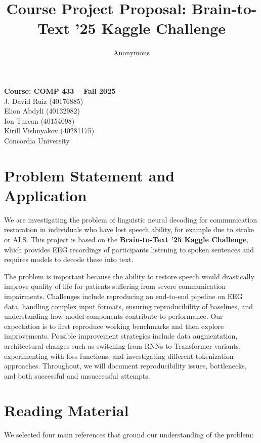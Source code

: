 \documentclass[10pt,twocolumn,letterpaper]{article}
\title{Course Project Proposal: Brain-to-Text '25 Kaggle Challenge}
\author{Anonymous} %
\begin{document}
\maketitle
\thispagestyle{empty}

\begin{center}
\textbf{Course: COMP 433 -- Fall 2025} \\[4pt]
J. David Ruiz (40176885) \\
Elion Abdyli (40132982) \\
Ion Turcan (40154098) \\
Kirill Vishnyakov (40281175) \\[6pt]
Concordia University
\end{center}

\section{Problem Statement and Application}
We are investigating the problem of linguistic neural decoding for communication restoration in individuals who have lost speech ability, for example due to stroke or ALS.  
This project is based on the \textbf{Brain-to-Text '25 Kaggle Challenge}, which provides EEG recordings of participants listening to spoken sentences and requires models to decode these into text.  

The problem is important because the ability to restore speech would drastically improve quality of life for patients suffering from severe communication impairments.  
Challenges include reproducing an end-to-end pipeline on EEG data, handling complex input formats, ensuring reproducibility of baselines, and understanding how model components contribute to performance.  
Our expectation is to first reproduce working benchmarks and then explore improvements.  
Possible improvement strategies include data augmentation, architectural changes such as switching from RNNs to Transformer variants, experimenting with loss functions, and investigating different tokenization approaches.  
Throughout, we will document reproducibility issues, bottlenecks, and both successful and unsuccessful attempts.  

\section{Reading Material}
We selected four main references that ground our understanding of the problem:  
\end{document}

